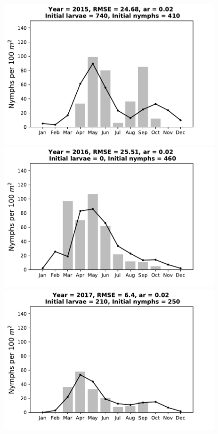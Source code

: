 \documentclass[a4paper, 11pt]{scrartcl}
\begin{document}
\begin{figure}[h!]
\begin{minipage}[c]{0.40\linewidth}
\end{minipage}
\begin{minipage}[c]{0.40\linewidth}
\includegraphics[width=\linewidth]{figures/s3/s3_2015}
\end{minipage}
\begin{minipage}[c]{0.40\linewidth}
\includegraphics[width=\linewidth]{figures/s3/s3_2016}
\end{minipage}
\begin{minipage}[c]{0.40\linewidth}
\includegraphics[width=\linewidth]{figures/s3/s3_2017}

\end{minipage}
\end{figure}
\end{document}
